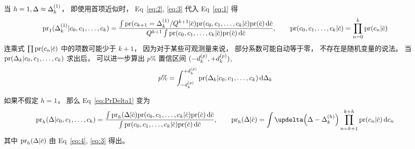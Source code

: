 当 $h=1, \Delta\approx\Delta_k^{(1)}$，
即使用首项近似时，
Eq~\eqref{eq:2}, \eqref{eq:3} 代入 Eq~\eqref{eq:1} 得
\begin{equation}
  \label{eq:PrDelta1}
  \dmspr_1(\dmsdeltako|\dmsccck)=
  \frac{\int\dmspr(c_{k+1}=\dmsdeltako/Q^{k+1}|\dmscbar)
    \dmspr(\dmsccck|\dmscbar)\dmspr(\dmscbar)\dmsdif\dmscbar}{
    Q^{k+1}\int\dmspr(\dmsccck|\dmscbar)\dmspr(\dmscbar)\dmsdif\dmscbar},
  \qquad
  \dmspr(\dmsccck|\dmscbar)=\prod_{n=0}^k\dmspr(c_n|\dmscbar)
\end{equation}
连乘式 $\prod\dmspr(c_n|\dmscbar)$ 中的项数可能少于 $k+1$，
因为对于某些可观测量来说，
部分系数可能自动等于零，
不存在是随机变量的说法。
当 $\textrm{pr}(\Delta_k|c_0,c_1,\ldots,c_k)$ 求出后，
可以进一步算出 $p\%$ 置信区间 $(-d_k^{(p)},+d_k^{(p)})$,
\begin{equation}
  \label{eq:DOB}
  p\%=\int_{-d_k^{(p)}}^{+d_k^{(p)}}\textrm{pr}(\Delta_k|c_0,c_1,\ldots,c_k)\,\mathrm{d}\Delta_k
\end{equation}

如果不假定 $h=1$，
那么 Eq~\eqref{eq:PrDelta1} 变为
\begin{equation}
  \label{eq:PrDeltah}
  \dmspr_h(\Delta|\dmsccck) = \frac{
    \int \dmspr_h(\Delta|\dmscbar)\dmspr(\dmsccck|\dmscbar)
    \dmspr(\dmscbar)\dmsdif\dmscbar}{
    \int \dmspr(\dmsccck|\dmscbar)\dmspr(\dmscbar)\dmsdif\dmscbar},
  \qquad
  \dmspr_h(\Delta|\dmscbar)=\int \updelta\Bigl(\Delta-\dmsdeltakh\Bigr)
  \prod_{n=k+1}^{k+h}\dmspr(c_n|\dmscbar)\dmsdif c_n
\end{equation}
其中 $\dmspr_h(\Delta|\dmscbar)$ 由 Eq~\eqref{eq:4}, \eqref{eq:3} 得出。
